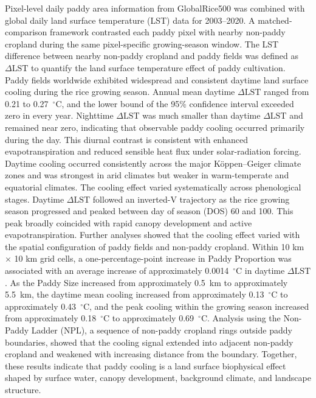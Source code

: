 Pixel-level daily paddy area information from GlobalRice500 was combined with global daily land surface temperature (LST) data for 2003–2020. A matched-comparison framework contrasted each paddy pixel with nearby non-paddy cropland during the same pixel-specific growing-season window. The LST difference between nearby non-paddy cropland and paddy fields was defined as $\Delta \mathrm{LST}$ to quantify the land surface temperature effect of paddy cultivation. 
Paddy fields worldwide exhibited widespread and consistent daytime land surface cooling during the rice growing season. Annual mean daytime $\Delta \mathrm{LST}$ ranged from 0.21 to 0.27~$^\circ$C, and the lower bound of the 95\% confidence interval exceeded zero in every year. 
Nighttime $\Delta \mathrm{LST}$ was much smaller than daytime $\Delta \mathrm{LST}$ and remained near zero, indicating that observable paddy cooling occurred primarily during the day. This diurnal contrast is consistent with enhanced evapotranspiration and reduced sensible heat flux under solar-radiation forcing.
Daytime cooling occurred consistently across the major Köppen–Geiger climate zones and was strongest in arid climates but weaker in warm-temperate and equatorial climates.
The cooling effect varied systematically across phenological stages. Daytime $\Delta \mathrm{LST}$ followed an inverted-V trajectory as the rice growing season progressed and peaked between day of season (DOS) 60 and 100. This peak broadly coincided with rapid canopy development and active evapotranspiration.
Further analyses showed that the cooling effect varied with the spatial configuration of paddy fields and non-paddy cropland.
Within 10 km $\times$ 10 km grid cells, a one-percentage-point increase in Paddy Proportion was associated with an average increase of approximately 0.0014~$^\circ$C in daytime $\Delta \mathrm{LST}$.
As the Paddy Size increased from approximately 0.5~km to approximately 5.5~km, the daytime mean cooling increased from approximately 0.13~$^\circ$C to approximately 0.43~$^\circ$C, and the peak cooling within the growing season increased from approximately 0.18~$^\circ$C to approximately 0.69~$^\circ$C.
Analysis using the Non-Paddy Ladder (NPL), a sequence of non-paddy cropland rings outside paddy boundaries, showed that the cooling signal extended into adjacent non-paddy cropland and weakened with increasing distance from the boundary.
Together, these results indicate that paddy cooling is a land surface biophysical effect shaped by surface water, canopy development, background climate, and landscape structure.

